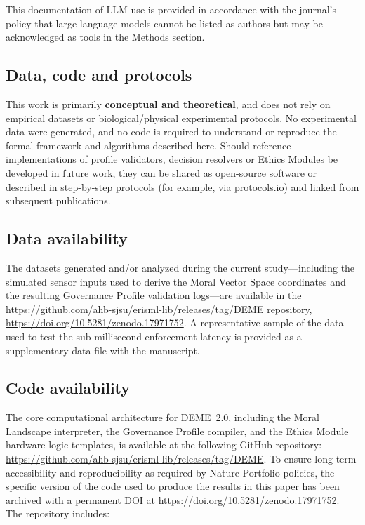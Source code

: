 \documentclass[11pt]{article}
\begin{document}
This documentation of LLM use is provided in accordance with the journal's policy that large language models cannot be listed as authors but may be acknowledged as tools in the Methods section.

\subsection*{Data, code and protocols}

This work is primarily \textbf{conceptual and theoretical}, and does not rely on empirical datasets or biological/physical experimental protocols. No experimental data were generated, and no code is required to understand or reproduce the formal framework and algorithms described here. Should reference implementations of profile validators, decision resolvers or Ethics Modules be developed in future work, they can be shared as open-source software or described in step-by-step protocols (for example, via protocols.io) and linked from subsequent publications.

\subsection*{Data availability}

The datasets generated and/or analyzed during the current study---including the simulated sensor inputs used to derive the Moral Vector Space coordinates and the resulting Governance Profile validation logs---are available in the \url{https://github.com/ahb-sjsu/erisml-lib/releases/tag/DEME} repository, \url{https://doi.org/10.5281/zenodo.17971752}. A representative sample of the data used to test the sub-millisecond enforcement latency is provided as a supplementary data file with the manuscript.

\subsection*{Code availability}

The core computational architecture for DEME~2.0, including the Moral Landscape interpreter, the Governance Profile compiler, and the Ethics Module hardware-logic templates, is available at the following GitHub repository: \url{https://github.com/ahb-sjsu/erisml-lib/releases/tag/DEME}. To ensure long-term accessibility and reproducibility as required by Nature Portfolio policies, the specific version of the code used to produce the results in this paper has been archived with a permanent DOI at \url{https://doi.org/10.5281/zenodo.17971752}. The repository includes:
\end{document}
